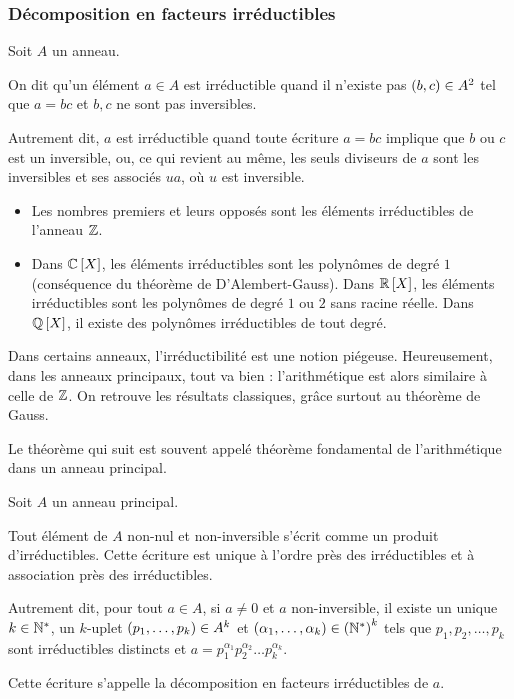 \subsubsection{Décomposition en facteurs irréductibles}

\begin{defi}
Soit \(A\) un anneau.

On dit qu'un élément \(a\in A\) est irréductible quand il n'existe pas \(\left(b,c\right)\in A^2\) tel que \(a=bc\) et \(b,c\) ne sont pas inversibles.
\end{defi}

Autrement dit, \(a\) est irréductible quand toute écriture \(a=bc\) implique que \(b\) ou \(c\) est un inversible, ou, ce qui revient au même, les seuls diviseurs de \(a\) sont les inversibles et ses associés \(ua\), où \(u\) est inversible.

\begin{ex}
\begin{itemize}
    \item Les nombres premiers et leurs opposés sont les éléments irréductibles de l'anneau \(\mathbb{Z}\). \\
    \item Dans \(\poly[\C]\), les éléments irréductibles sont les polynômes de degré \(1\) (conséquence du théorème de D'Alembert-Gauss). Dans \(\poly[\R]\), les éléments irréductibles sont les polynômes de degré \(1\) ou \(2\) sans racine réelle. Dans \(\poly[\Q]\), il existe des polynômes irréductibles de tout degré.
\end{itemize}
\end{ex}

Dans certains anneaux, l'irréductibilité est une notion piégeuse. Heureusement, dans les anneaux principaux, tout va bien : l'arithmétique est alors similaire à celle de \(\mathbb{Z}\). On retrouve les résultats classiques, grâce surtout au théorème de Gauss.

Le théorème qui suit est souvent appelé théorème fondamental de l'arithmétique dans un anneau principal.

\begin{theo}
Soit \(A\) un anneau principal.

Tout élément de \(A\) non-nul et non-inversible s'écrit comme un produit d'irréductibles. Cette écriture est unique à l'ordre près des irréductibles et à association près des irréductibles.

Autrement dit, pour tout \(a\in A\), si \(a\not=0\) et \(a\) non-inversible, il existe un unique \(k\in\mathbb{N}^*\), un \(k\)-uplet \(\left(p_1,\dots,p_k\right)\in A^k\) et \(\left(\alpha_1,\dots,\alpha_k\right)\in\left(\mathbb{N}^*\right)^k\) tels que \(p_1,p_2,\dots,p_k\) sont irréductibles distincts et \(a=p_1^{\alpha_1}p_2^{\alpha_2}\dots p_k^{\alpha_k}\).

Cette écriture s'appelle la décomposition en facteurs irréductibles de \(a\).
\end{theo}

